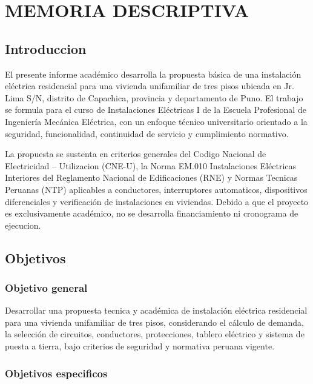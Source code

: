 \chapter{MEMORIA DESCRIPTIVA}

\section{Introduccion}

El presente informe académico desarrolla la propuesta básica de una instalación eléctrica residencial para una vivienda unifamiliar de tres pisos ubicada en Jr. Lima S/N, distrito de Capachica, provincia y departamento de Puno. El trabajo se formula para el curso de Instalaciones Eléctricas I de la Escuela Profesional de Ingeniería Mecánica Eléctrica, con un enfoque técnico universitario orientado a la seguridad, funcionalidad, continuidad de servicio y cumplimiento normativo.

La propuesta se sustenta en criterios generales del Codigo Nacional de Electricidad -- Utilizacion (CNE-U), la Norma EM.010 Instalaciones Eléctricas Interiores del Reglamento Nacional de Edificaciones (RNE) y Normas Tecnicas Peruanas (NTP) aplicables a conductores, interruptores automaticos, dispositivos diferenciales y verificación de instalaciones en viviendas. Debido a que el proyecto es exclusivamente académico, no se desarrolla financiamiento ni cronograma de ejecucion.

\section{Objetivos}

\subsection{Objetivo general}

Desarrollar una propuesta tecnica y académica de instalación eléctrica residencial para una vivienda unifamiliar de tres pisos, considerando el cálculo de demanda, la selección de circuitos, conductores, protecciones, tablero eléctrico y sistema de puesta a tierra, bajo criterios de seguridad y normativa peruana vigente.

\subsection{Objetivos especificos}

